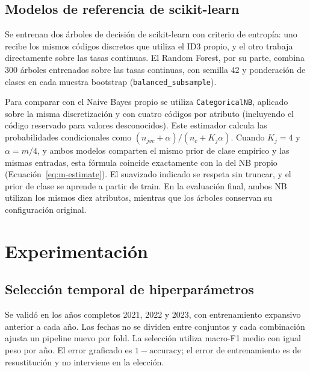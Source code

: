 \documentclass[conference]{IEEEtran}
\begin{document}
\subsection{Modelos de referencia de scikit-learn}
Se entrenan dos árboles de decisión de scikit-learn con criterio de entropía: uno recibe los mismos códigos discretos que utiliza el ID3 propio, y el otro trabaja directamente sobre las tasas continuas. El Random Forest, por su parte, combina 300 árboles entrenados sobre las tasas continuas, con semilla 42 y ponderación de clases en cada muestra bootstrap (\texttt{balanced\_subsample}).

Para comparar con el Naive Bayes propio se utiliza \texttt{CategoricalNB}, aplicado sobre la misma discretización y con cuatro códigos por atributo (incluyendo el código reservado para valores desconocidos). Este estimador calcula las probabilidades condicionales como $(n_{jvc}+\alpha)/(n_c+K_j\alpha)$. Cuando $K_j=4$ y $\alpha=m/4$, y ambos modelos comparten el mismo prior de clase empírico y las mismas entradas, esta fórmula coincide exactamente con la del NB propio (Ecuación~\ref{eq:m-estimate}). El suavizado indicado se respeta sin truncar, y el prior de clase se aprende a partir de train. En la evaluación final, ambos NB utilizan los mismos diez atributos, mientras que los árboles conservan su configuración original.

\section{Experimentación}
\label{sec:experimentacion}

\subsection{Selección temporal de hiperparámetros}
Se validó en los años completos 2021, 2022 y 2023, con entrenamiento expansivo anterior a cada año. Las fechas no se dividen entre conjuntos y cada combinación ajusta un pipeline nuevo por fold. La selección utiliza macro-F1 medio con igual peso por año. El error graficado es $1-\mathrm{accuracy}$; el error de entrenamiento es de resustitución y no interviene en la elección.
\end{document}
